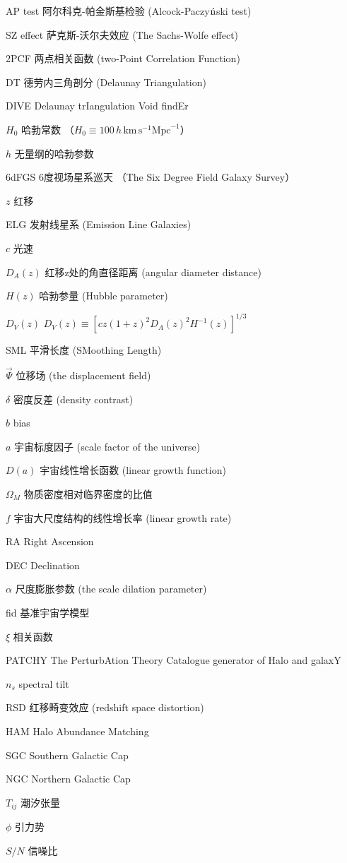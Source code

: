 \begin{denotation}[3cm]
\item[AP test] 阿尔科克-帕金斯基检验 (Alcock-Paczy$\acute{\rm n}$ski test)
\item[SZ effect] 萨克斯-沃尔夫效应 (The Sachs-Wolfe effect)
\item[2PCF] 两点相关函数 (two-Point Correlation Function)
\item[DT] 德劳内三角剖分 (Delaunay Triangulation)
\item[DIVE] Delaunay trIangulation Void findEr
\item[$H_0$] 哈勃常数 （$H_0 \equiv 100\,h\,\mathrm{km}\,\mathrm{s}^{-1}\mathrm{Mpc}^{-1}$）
\item[$h$] 无量纲的哈勃参数
\item[6dFGS] 6度视场星系巡天 （The Six Degree Field Galaxy Survey）
\item[$z$] 红移
\item[ELG] 发射线星系 (Emission Line Galaxies)
\item[$c$] 光速
\item[$D_A(z)$] 红移z处的角直径距离 (angular diameter distance)
\item[$H(z)$] 哈勃参量 (Hubble parameter)
\item[$D_V(z)$] $D_V(z) \equiv \left[ cz (1+z)^2 D_A(z)^2 H^{-1}(z) \right]^{1/3}$
\item[SML] 平滑长度 (SMoothing Length)
\item[$\vec{\Psi}$] 位移场 (the displacement field)
\item[$\delta$] 密度反差 (density contrast)
\item[$b$] bias
\item[$a$] 宇宙标度因子 (scale factor of the universe)
\item[$D(a)$] 宇宙线性增长函数 (linear growth function)
\item[$\Omega_{M}$] 物质密度相对临界密度的比值
\item[$f$] 宇宙大尺度结构的线性增长率 (linear growth rate)
\item[RA] Right Ascension
\item[DEC] Declination
\item[$\alpha$] 尺度膨胀参数 (the scale dilation parameter)
\item[fid] 基准宇宙学模型
\item[$\xi$] 相关函数
\item[PATCHY] The PerturbAtion Theory Catalogue generator of Halo and galaxY
\item[$n_s$] spectral tilt
\item[RSD] 红移畸变效应 (redshift space distortion)
\item[HAM] Halo Abundance Matching
\item[SGC] Southern Galactic Cap
\item[NGC] Northern Galactic Cap
\item[$T_{ij}$] 潮汐张量
\item[$\phi$] 引力势
\item[$S/N$] 信噪比
\end{denotation}
